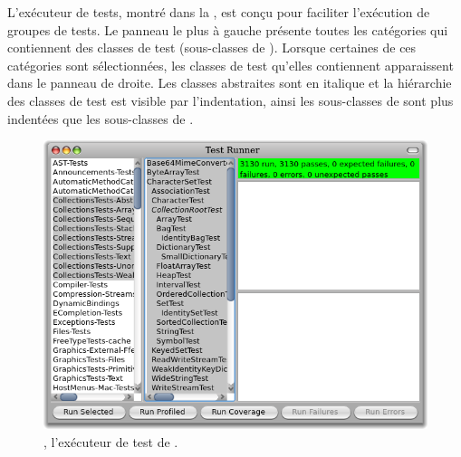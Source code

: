 \documentclass[a4paper,10pt,twoside]{book}
\begin{document}
L'exécuteur de tests, montré dans la , est conçu pour faciliter l'exécution de groupes de tests.
Le panneau le plus à gauche présente toutes les catégories qui
contiennent des classes de test (\ie  sous-classes de
). Lorsque certaines de ces catégories sont
sélectionnées, les classes de test qu'elles contiennent apparaissent
dans le panneau de droite.
Les classes abstraites sont en italique et la hiérarchie des classes de test est visible par l'indentation, ainsi les sous-classes de   sont plus indentées que les sous-classes de .

\begin{figure}[tbh]
  \begin{center}
	\includegraphics[width=\linewidth]{test-runner}
	\caption{\sunit, l'exécuteur de test de \pharo.}
  \end{center}
\end{figure}



\end{document}
